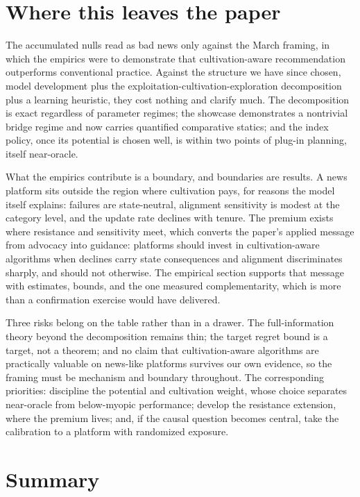\documentclass[11pt]{article}
\begin{document}
\section{Where this leaves the paper}\label{sec:paper}

The accumulated nulls read as bad news only against the March framing, in
which the empirics were to demonstrate that cultivation-aware
recommendation outperforms conventional practice. Against the structure we
have since chosen, model development plus the
exploitation-cultivation-exploration decomposition plus a learning
heuristic, they cost nothing and clarify much. The decomposition is exact
regardless of parameter regimes; the showcase demonstrates a nontrivial
bridge regime and now carries quantified comparative statics; and the
index policy, once its potential is chosen well, is within two points of
plug-in planning, itself near-oracle.

What the empirics contribute is a boundary, and boundaries are results. A
news platform sits outside the region where cultivation pays, for reasons
the model itself explains: failures are state-neutral, alignment
sensitivity is modest at the category level, and the update rate declines
with tenure. The premium exists where resistance and sensitivity meet,
which converts the paper's applied message from advocacy into guidance:
platforms should invest in cultivation-aware algorithms when declines
carry state consequences and alignment discriminates sharply, and should
not otherwise. The empirical section supports that message with
estimates, bounds, and the one measured complementarity, which is more
than a confirmation exercise would have delivered.

Three risks belong on the table rather than in a drawer. The
full-information theory beyond the decomposition remains thin; the
target regret bound is a target, not a theorem; and no claim that
cultivation-aware algorithms are practically valuable on news-like
platforms survives our own evidence, so the framing must be mechanism
and boundary throughout. The corresponding priorities: discipline the
potential and cultivation weight, whose choice separates near-oracle
from below-myopic performance; develop the resistance extension, where
the premium lives; and, if the causal question becomes central, take the
calibration to a platform with randomized exposure.

\section{Summary}\label{sec:take}
\end{document}
